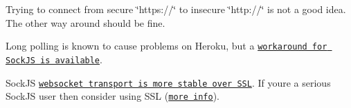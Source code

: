 \begin{DoxyItemize}
\item Trying to connect from secure \char`\"{}https\+://\char`\"{} to insecure \char`\"{}http\+://\char`\"{} is not a good idea. The other way around should be fine.
\item Long polling is known to cause problems on Heroku, but a \href{https://github.com/sockjs/sockjs-node/issues/57#issuecomment-5242187}{\tt workaround for Sock\+JS is available}.
\item Sock\+JS \href{https://github.com/sockjs/sockjs-client/issues/94}{\tt websocket transport is more stable over S\+SL}. If you\textquotesingle{}re a serious Sock\+JS user then consider using S\+SL (\href{https://www.ietf.org/mail-archive/web/hybi/current/msg01605.html}{\tt more info}). 
\end{DoxyItemize}